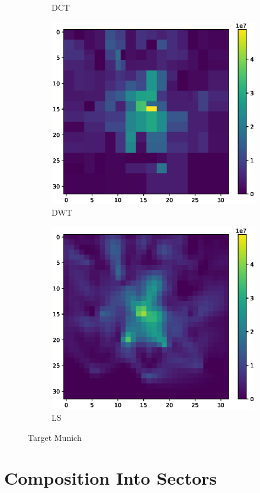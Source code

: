 \begin{figure}
\begin{subfigure}[b]{0.32\textwidth}
        \caption{DCT}
    \end{subfigure}    
    \begin{subfigure}[b]{0.32\textwidth}
        \includegraphics[width=\textwidth]{figures/06_results/gaussian_plume_example/munich/bp_dwt_snr_40_db.eps}
        \caption{DWT}
    \end{subfigure}
    \begin{subfigure}[b]{0.32\textwidth}
        \includegraphics[width=\textwidth]{figures/06_results/gaussian_plume_example/munich/least_squares_snr_40_db.eps}
        \caption{LS}
    \end{subfigure}
    \caption{Target Munich}
\end{figure}

\section{Composition Into Sectors}

